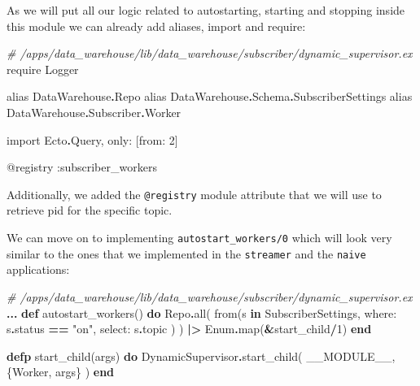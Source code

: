 \documentclass[
  oneside]{book}
\newenvironment{Shaded}{\begin{snugshade}}{\end{snugshade}}
\newcommand{\CommentTok}[1]{\textcolor[rgb]{0.56,0.35,0.01}{\textit{#1}}}
\newcommand{\ConstantTok}[1]{\textcolor[rgb]{0.00,0.00,0.00}{#1}}
\newcommand{\DecValTok}[1]{\textcolor[rgb]{0.00,0.00,0.81}{#1}}
\newcommand{\ImportTok}[1]{#1}
\newcommand{\KeywordTok}[1]{\textcolor[rgb]{0.13,0.29,0.53}{\textbf{#1}}}
\newcommand{\NormalTok}[1]{#1}
\newcommand{\OperatorTok}[1]{\textcolor[rgb]{0.81,0.36,0.00}{\textbf{#1}}}
\newcommand{\OtherTok}[1]{\textcolor[rgb]{0.56,0.35,0.01}{#1}}
\newcommand{\StringTok}[1]{\textcolor[rgb]{0.31,0.60,0.02}{#1}}
\newcommand{\VariableTok}[1]{\textcolor[rgb]{0.00,0.00,0.00}{#1}}
\begin{document}
As we will put all our logic related to autostarting, starting and stopping inside this module we can already add aliases, import and require:

\begin{Shaded}
\begin{Highlighting}[]
\CommentTok{\# /apps/data\_warehouse/lib/data\_warehouse/subscriber/dynamic\_supervisor.ex}
  \ImportTok{require} \ConstantTok{Logger}

  \ImportTok{alias} \ConstantTok{DataWarehouse}\OperatorTok{.}\ConstantTok{Repo}
  \ImportTok{alias} \ConstantTok{DataWarehouse}\OperatorTok{.}\ConstantTok{Schema}\OperatorTok{.}\ConstantTok{SubscriberSettings}
  \ImportTok{alias} \ConstantTok{DataWarehouse}\OperatorTok{.}\ConstantTok{Subscriber}\OperatorTok{.}\ConstantTok{Worker}

  \ImportTok{import} \ConstantTok{Ecto}\OperatorTok{.}\ConstantTok{Query}\NormalTok{, }\VariableTok{only:}\NormalTok{ [}\VariableTok{from:} \DecValTok{2}\NormalTok{]}

  \OtherTok{@registry} \VariableTok{:subscriber\_workers}
\end{Highlighting}
\end{Shaded}

Additionally, we added the \texttt{@registry} module attribute that we will use to retrieve pid for the specific topic.

We can move on to implementing \texttt{autostart\_workers/0} which will look very similar to the ones that we implemented in the \texttt{streamer} and the \texttt{naive} applications:

\begin{Shaded}
\begin{Highlighting}[]
  \CommentTok{\# /apps/data\_warehouse/lib/data\_warehouse/subscriber/dynamic\_supervisor.ex}
  \OperatorTok{...}
  \KeywordTok{def}\NormalTok{ autostart\_workers() }\KeywordTok{do}
    \ConstantTok{Repo}\OperatorTok{.}\NormalTok{all(}
\NormalTok{      from(s }\KeywordTok{in} \ConstantTok{SubscriberSettings}\NormalTok{,}
        \VariableTok{where:}\NormalTok{ s}\OperatorTok{.}\NormalTok{status }\OperatorTok{==} \StringTok{"on"}\NormalTok{,}
        \VariableTok{select:}\NormalTok{ s}\OperatorTok{.}\NormalTok{topic}
\NormalTok{      )}
\NormalTok{    )}
    \OperatorTok{|\textgreater{}} \ConstantTok{Enum}\OperatorTok{.}\NormalTok{map(}\OperatorTok{\&}\NormalTok{start\_child}\OperatorTok{/}\DecValTok{1}\NormalTok{)}
  \KeywordTok{end}

  \KeywordTok{defp}\NormalTok{ start\_child(args) }\KeywordTok{do}
    \ConstantTok{DynamicSupervisor}\OperatorTok{.}\NormalTok{start\_child(}
      \ConstantTok{\_\_MODULE\_\_}\NormalTok{,}
\NormalTok{      \{}\ConstantTok{Worker}\NormalTok{, args\}}
\NormalTok{    )}
  \KeywordTok{end}
\end{Highlighting}
\end{Shaded}
\end{document}
